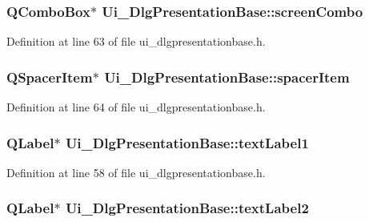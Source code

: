 \hypertarget{classUi__DlgPresentationBase_a588ed0d2c3045e6179c739bdf354e812}{
\subsubsection[{screen\+Combo}]{\setlength{\rightskip}{0pt plus 5cm}Q\+Combo\+Box$\ast$ Ui\+\_\+\+Dlg\+Presentation\+Base\+::screen\+Combo}}\label{classUi__DlgPresentationBase_a588ed0d2c3045e6179c739bdf354e812}


Definition at line 63 of file ui\+\_\+dlgpresentationbase.\+h.

\hypertarget{classUi__DlgPresentationBase_aa08144be96f8def7a8157c4c5c4b4b09}{
\subsubsection[{spacer\+Item}]{\setlength{\rightskip}{0pt plus 5cm}Q\+Spacer\+Item$\ast$ Ui\+\_\+\+Dlg\+Presentation\+Base\+::spacer\+Item}}\label{classUi__DlgPresentationBase_aa08144be96f8def7a8157c4c5c4b4b09}


Definition at line 64 of file ui\+\_\+dlgpresentationbase.\+h.

\hypertarget{classUi__DlgPresentationBase_a378f091644c96cc7d40ea73433402362}{
\subsubsection[{text\+Label1}]{\setlength{\rightskip}{0pt plus 5cm}Q\+Label$\ast$ Ui\+\_\+\+Dlg\+Presentation\+Base\+::text\+Label1}}\label{classUi__DlgPresentationBase_a378f091644c96cc7d40ea73433402362}


Definition at line 58 of file ui\+\_\+dlgpresentationbase.\+h.

\hypertarget{classUi__DlgPresentationBase_acbcb684cbb6019f342e3915f13e88dd7}{
\subsubsection[{text\+Label2}]{\setlength{\rightskip}{0pt plus 5cm}Q\+Label$\ast$ Ui\+\_\+\+Dlg\+Presentation\+Base\+::text\+Label2}}\label{classUi__DlgPresentationBase_acbcb684cbb6019f342e3915f13e88dd7}


